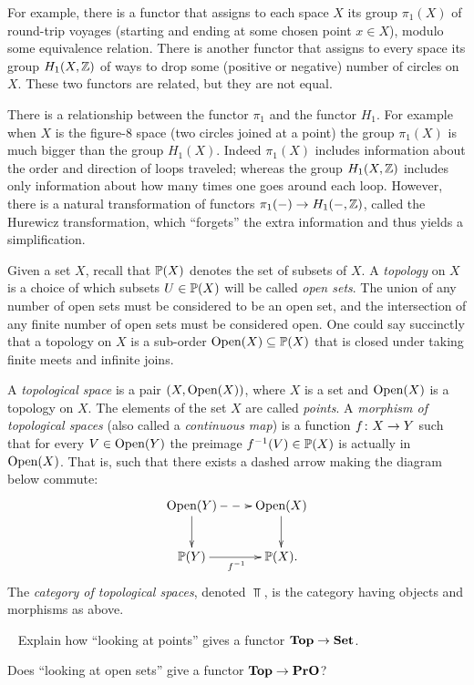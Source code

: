 For example, there is a functor that assigns to each space $X$ its group $\pi_1(X)$ of round-trip voyages (starting and ending at some chosen point $x\in X$), modulo some equivalence relation. There is another functor that assigns to every space its group $H_1(X,{\mathbb Z})$ of ways to drop some (positive or negative) number of circles on $X$. These two functors are related, but they are not equal. 

There is a relationship between the functor $\pi_1$ and the functor $H_1$. For example when $X$ is the figure-$8$ space (two circles joined at a point) the group $\pi_1(X)$ is much bigger than the group $H_1(X)$. Indeed $\pi_1(X)$ includes information about the order and direction of loops traveled; whereas the group $H_1(X,{\mathbb Z})$ includes only information about how many times one goes around each loop. However, there is a natural transformation of functors $\pi_1(-)\rightarrow H_1(-,{\mathbb Z})$, called the Hurewicz transformation, which “forgets” the extra information and thus yields a simplification. 

\begin{example}\label{ex:topological space}
Given a set $X$, recall that ${\mathbb P}(X)$ denotes the set of subsets of $X$. A {\em topology} on $X$ is a choice of which subsets $U\in{\mathbb P}(X)$ will be called {\em open sets}. The union of any number of open sets must be considered to be an open set, and the intersection of any finite number of open sets must be considered open. One could say succinctly that a topology on $X$ is a sub-order $\textnormal{Open}(X)\subseteq{\mathbb P}(X)$ that is closed under taking finite meets and infinite joins.

A {\em topological space} is a pair $(X,\textnormal{Open}(X))$, where $X$ is a set and $\textnormal{Open}(X)$ is a topology on $X$. The elements of the set $X$ are called {\em points}. A {\em morphism of topological spaces} (also called a {\em continuous map}) is a function $f\colon X\rightarrow Y$ such that for every $V\in\textnormal{Open}(Y)$ the preimage $f^\m1(V)\in\PP(X)$ is actually in $\textnormal{Open}(X)$. That is, such that there exists a dashed arrow making the diagram below commute:
$$\xymatrix{\Op(Y)\ar@{-->}[r]\ar[d]&\Op(X)\ar[d]\\\PP(Y)\ar[r]_{f^\m1}&\PP(X).}$$
The {\em category of topological spaces}, denoted $\Top$, is the category having objects and morphisms as above.

\end{example}

\begin{exercise}\label{exc:points and opens in Top}~
\sexc Explain how “looking at points” gives a functor ${\bf Top}\rightarrow{\bf Set}$.
\item Does “looking at open sets” give a functor ${\bf Top}\rightarrow{\bf PrO}$?
\endsexc
\end{exercise}

